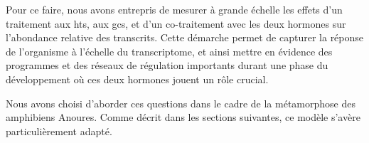 \documentclass[../main.tex]{subfiles}
\begin{document}
		

		Pour ce faire, nous avons entrepris de mesurer à grande échelle les effets d'un traitement aux \glspl{ht}, aux \glspl{gc}, et d'un co-traitement avec les deux hormones sur l'abondance relative des transcrits.
		Cette démarche permet de capturer la réponse de l'organisme à l'échelle du transcriptome, et ainsi mettre en évidence des programmes et des réseaux de régulation importants durant une phase du développement où ces deux hormones jouent un rôle crucial.
		\par
		Nous avons choisi d'aborder ces questions dans le cadre de la métamorphose des amphibiens Anoures.
		Comme décrit dans les sections suivantes, ce modèle s'avère particulièrement adapté.



\end{document}

